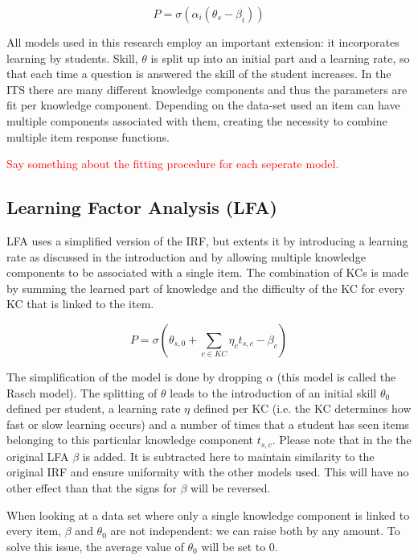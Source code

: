 \documentclass{scrartcl}
\newcommand\todo[1]{\textcolor{red}{#1}}
\begin{document}
\begin{equation}
\label{eq:irt}
P = \sigma(\alpha_{i} (\theta_{s} - \beta_{i}))
\end{equation}

All models used in this research employ an important extension: it incorporates learning by students. Skill, $\theta$ is split up into an initial part and a learning rate, so that each time a question is answered the skill of the student increases. In the ITS there are many different knowledge components and thus the parameters are fit per knowledge component. Depending on the data-set used an item can have multiple components associated with them, creating the necessity to combine multiple item response functions.

\todo{Say something about the fitting procedure for each seperate model.}

\subsection{Learning Factor Analysis (LFA)}
\label{sec:LFA}


LFA uses a simplified version of the IRF, but extents it by introducing a learning rate as discussed in the introduction and by allowing multiple knowledge components to be associated with a single item. The combination of KCs is made by summing the learned part of knowledge and the difficulty of the KC for every KC that is linked to the item.

\begin{equation}
P = \sigma(\theta_{s,0} + \sum_{c \in KC}  \eta_{c} t_{s,c} - \beta_{c})
\end{equation}

The simplification of the model is done by dropping $\alpha$ (this model is called the Rasch model). The splitting of $\theta$ leads to the introduction of an initial skill $\theta_{0}$ defined per student, a learning rate $\eta$ defined per KC (i.e. the KC determines how fast or slow learning occurs) and a number of times that a student has seen items belonging to this particular knowledge component $t_{s,c}$. Please note that in the the original LFA $\beta$ is added. It is subtracted here to maintain similarity to the original IRF and ensure uniformity with the other models used. This will have no other effect than that the signs for $\beta$ will be reversed.

When looking at a data set where only a single knowledge component is linked to every item, $\beta$ and $\theta_{0}$ are not independent: we can raise both by any amount. To solve this issue, the average value of $\theta_{0}$ will be set to 0.
\end{document}
